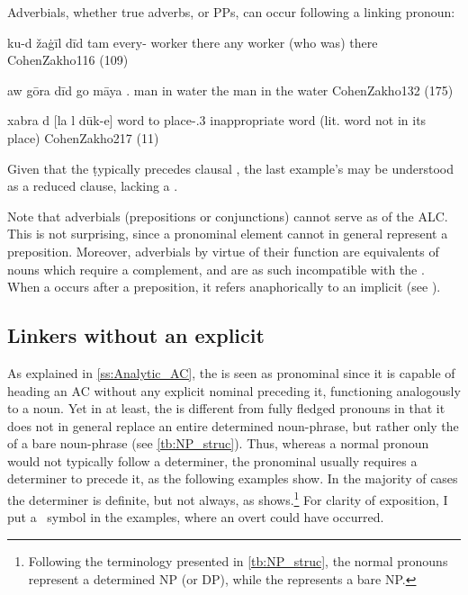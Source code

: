 Adverbials, whether true adverbs, or PPs, can occur following a linking pronoun:

{ku-d žaġīl dīd tam}
{every-\cst{} worker \lnkd{} there}
{any worker (who was) there}
{CohenZakho}{116 (109)}

{aw gōra dīd go māya}
{.\masc{} man \lnkd{} in water}
{the man in the water}
{CohenZakho}{132 (175)}

{xabra d\cb{} [la l\cb{} dūk-e]}
{word \lnk\cb{} \neg{} to\cb{} place-\poss.3\masc}
{inappropriate word (lit. word not in its place)}
{CohenZakho}{217 (11)}

Given that the \lnk* \d typically precedes clausal \secns, the last example's \secn may be understood as a reduced clause, lacking a .

Note that adverbials (prepositions or conjunctions) cannot serve as \prims of the ALC. This is not surprising, since a pronominal element cannot in general represent a preposition. Moreover, adverbials by virtue of their function are equivalents of \cst* nouns which require a complement, and are as such incompatible with the \lnk*. When a \lnk* occurs after a preposition, it refers anaphorically to an implicit \prim (see ).


\subsection{Linkers without an explicit \prim} \label{ss:JZax_lnk_zero_head}


As explained in \ref{ss:Analytic_AC}, the \lnk* is seen as pronominal since it  is capable of heading an AC without any explicit nominal preceding it, functioning analogously to a \cst* noun. Yet  in \JZax at least, the \lnk* is different from fully fledged pronouns in that it does not in general replace an entire determined noun-phrase, but rather only the  of a bare noun-phrase (see \vref{tb:NP_struc}). Thus, whereas a normal pronoun would not typically follow a determiner, the pronominal \lnk* usually requires a determiner to precede it, as the following examples show. In the majority of cases the determiner is definite, but not always, as  shows.\footnote{Following the terminology presented in \vref{tb:NP_struc}, the normal pronouns represent a determined NP (or DP), while the \lnk* represents a bare NP.} 
For clarity of exposition, I put a \zero\ symbol in the examples, where an overt \prim could have occurred.



